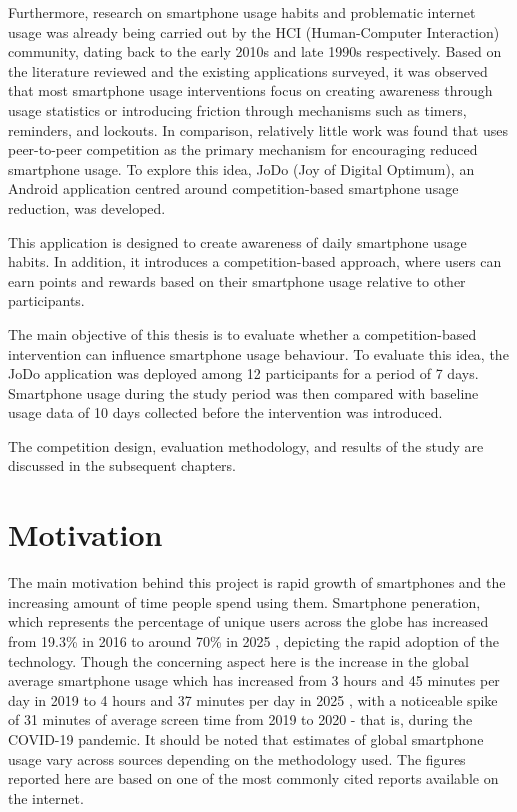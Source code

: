 \documentclass[11pt]{report}
\begin{document}
Furthermore, research on smartphone usage habits and problematic internet usage was 
already being carried out by the HCI (Human-Computer Interaction) community, 
dating back to the early 2010s and late 1990s respectively. Based on the literature 
reviewed and the existing applications surveyed, it 
was observed that most smartphone usage interventions focus on creating awareness 
through usage statistics or introducing friction through mechanisms such as timers, 
reminders, and lockouts. In comparison, relatively little work was found that uses 
peer-to-peer competition as the primary mechanism for encouraging reduced smartphone usage. 
To explore this idea, JoDo (Joy of Digital Optimum), an Android application centred 
around competition-based smartphone usage reduction, was developed.

This application is designed to create awareness of daily smartphone usage habits. 
In addition, it introduces a competition-based approach, where users can earn points 
and rewards based on their smartphone usage relative to other participants.

The main objective of this thesis is to evaluate whether a competition-based intervention 
can influence smartphone usage behaviour. To evaluate this idea, the JoDo application was 
deployed among 12 participants for a period of 7 days. Smartphone usage during the study 
period was then compared with baseline usage data of 10 days collected before the intervention was 
introduced.

The competition design, evaluation methodology, and results of the study are discussed in 
the subsequent chapters.

\section{Motivation}

The main motivation behind this project is rapid growth of smartphones and the increasing 
amount of time people spend using them. Smartphone peneration, which represents the percentage
of unique users across the globe has increased from 19.3\% in 2016 to around 70\% in 2025 
\cite{gsma2017mobileeconomy,gsma_mobile_economy_2025}, 
depicting the rapid adoption of the technology. Though the concerning aspect here is the 
increase in the global average smartphone usage which has increased from 3 hours and 45 minutes 
per day in 2019 to 4 hours and 37 minutes per day in 2025 \cite{explodingtopics2025smartphone,datareportal2025digital}, with a noticeable spike of 
31 minutes of average screen time from 2019 to 2020 - that is, during the COVID-19 pandemic. 
It should be noted that estimates of global smartphone usage vary across sources depending on the methodology used. 
The figures reported here are based on one of the most commonly cited reports available on the internet.
\end{document}
